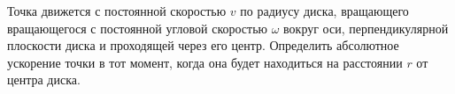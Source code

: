 Точка движется с постоянной скоростью $v$ по радиусу диска, вращающего
вращающегося с постоянной угловой скоростью $\omega$ вокруг оси,
перпендикулярной плоскости диска и проходящей через его центр.
Определить абсолютное ускорение точки в тот момент, когда она будет
находиться на расстоянии $r$ от центра диска.
